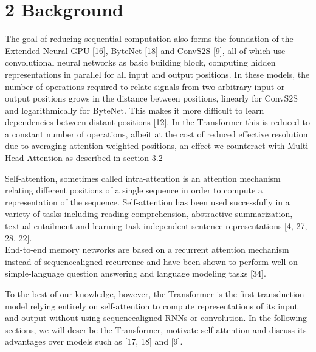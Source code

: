 \documentclass[10pt]{article}
\begin{document}
\section*{2 Background}
The goal of reducing sequential computation also forms the foundation of the Extended Neural GPU [16], ByteNet [18] and ConvS2S [9], all of which use convolutional neural networks as basic building block, computing hidden representations in parallel for all input and output positions. In these models, the number of operations required to relate signals from two arbitrary input or output positions grows in the distance between positions, linearly for ConvS2S and logarithmically for ByteNet. This makes it more difficult to learn dependencies between distant positions [12]. In the Transformer this is reduced to a constant number of operations, albeit at the cost of reduced effective resolution due to averaging attention-weighted positions, an effect we counteract with Multi-Head Attention as described in section 3.2

Self-attention, sometimes called intra-attention is an attention mechanism relating different positions of a single sequence in order to compute a representation of the sequence. Self-attention has been used successfully in a variety of tasks including reading comprehension, abstractive summarization, textual entailment and learning task-independent sentence representations [4, 27, 28, 22].\\[0pt]
End-to-end memory networks are based on a recurrent attention mechanism instead of sequencealigned recurrence and have been shown to perform well on simple-language question answering and language modeling tasks [34].

To the best of our knowledge, however, the Transformer is the first transduction model relying entirely on self-attention to compute representations of its input and output without using sequencealigned RNNs or convolution. In the following sections, we will describe the Transformer, motivate self-attention and discuss its advantages over models such as [17, 18] and [9].
\end{document}
